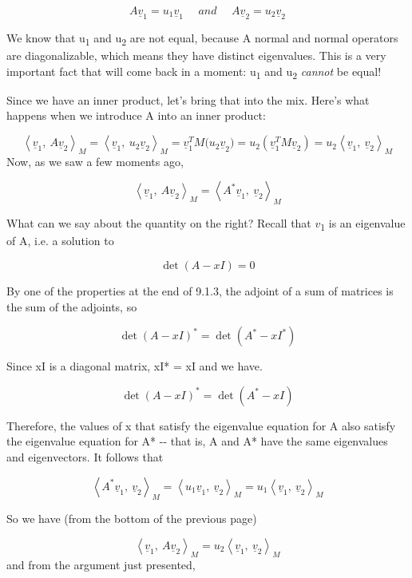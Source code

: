 \documentclass[oneside,english]{amsbook}
\numberwithin{section}{chapter}
\theoremstyle{plain}
\theoremstyle{definition}
\begin{document}
\[A{\underline{v}}_{1} = u_{1}{\underline{v}}_{1}\ \ \ \ \ \ and\ \ \ \ \ \ A{\underline{v}}_{2} = u_{2}{\underline{v}}_{2}\]

We know that u\textsubscript{1} and u\textsubscript{2} are not equal,
because A normal and normal operators are diagonalizable, which means
they have distinct eigenvalues. This is a very important fact that will
come back in a moment: u\textsubscript{1} and u\textsubscript{2}
\emph{cannot} be equal!

Since we have an inner product, let's bring that into the mix. Here's
what happens when we introduce A into an inner product:

\[{\left\langle {\underline{v}}_{1},\ A{\underline{v}}_{2} \right\rangle_{M} = \left\langle {\underline{v}}_{1},\ u_{2}{\underline{v}}_{2} \right\rangle_{M}
}{= {\underline{v}}_{1}^{T}{M(u_{2}\underline{v}}_{2})
}{= u_{2}\left( {\underline{v}}_{1}^{T}M{\underline{v}}_{2} \right)
}{= u_{2}\left\langle {\underline{v}}_{1},\ {\underline{v}}_{2} \right\rangle_{M}
}\]Now, as we saw a few moments ago,

\[\left\langle {\underline{v}}_{1},\ A{\underline{v}}_{2} \right\rangle_{M} = \left\langle A^{*}{\underline{v}}_{1},\ {\underline{v}}_{2} \right\rangle_{M}\]

What can we say about the quantity on the right? Recall that
$v$\textsubscript{1} is an eigenvalue of A, i.e. a solution to

\[\det(A - xI) = 0\]

By one of the properties at the end of 9.1.3, the adjoint of a sum of
matrices is the sum of the adjoints, so

\[\det(A - xI)^{*} = \det\left( A^{*} - xI^{*} \right)\]

Since xI is a diagonal matrix, xI* = xI and we have.

\[\det(A - xI)^{*} = \det\left( A^{*} - xI \right)\]

Therefore, the values of x that satisfy the eigenvalue equation for A
also satisfy the eigenvalue equation for A* -\/- that is, A and A* have
the same eigenvalues and eigenvectors. It follows that

\[\left\langle A^{*}{\underline{v}}_{1},\ {\underline{v}}_{2} \right\rangle_{M} = \left\langle u_{1}{\underline{v}}_{1},\ {\underline{v}}_{2} \right\rangle_{M}{= u_{1}\left\langle {\underline{v}}_{1},\ {\underline{v}}_{2} \right\rangle}_{M}\]

So we have (from the bottom of the previous page)

\[\left\langle {\underline{v}}_{1},\ A{\underline{v}}_{2} \right\rangle_{M} = u_{2}\left\langle {\underline{v}}_{1},\ {\underline{v}}_{2} \right\rangle_{M}
\]and from the argument just presented,
\end{document}
